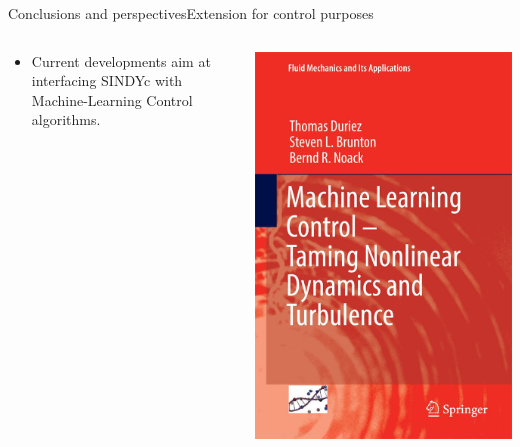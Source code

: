 \documentclass[usenames,dvipsnames,svgnames,10pt,aspectratio=169]{beamer}
\begin{document}
\begin{frame}[t, c]{Conclusions and perspectives}{Extension for control purposes}
\begin{columns}
\begin{column}{.6\textwidth}
\begin{itemize}
				\item Current developments aim at interfacing SINDYc with Machine-Learning Control algorithms.
			\end{itemize}
		\end{column}
		\begin{column}{.4\textwidth}
			\centering
			\includegraphics[height=.6\textheight]{mlc_book}
		\end{column}
	\end{columns}

	\vspace{0.5cm}
\end{frame}
\end{document}
